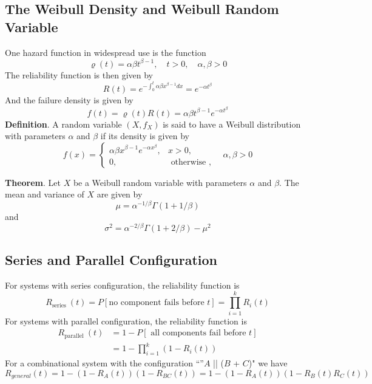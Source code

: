 \documentclass[a4paper,12pt]{article}
\begin{document}
    \subsection{The Weibull Density and Weibull Random Variable}
    One hazard function in widespread use is the function
    $$
\varrho(t)=\alpha \beta t^{\beta-1}, \quad t>0, \quad \alpha, \beta>0
$$
    The reliability function is then given by
    \begin{equation}
        R(t)=e^{-\int_0^t \alpha \beta x^{\beta-1} d x}=e^{-\alpha t^\beta}
        \end{equation}
    And the failure density is given by
    \begin{equation}
        f(t)=\varrho(t) R(t)=\alpha \beta t^{\beta-1} e^{-\alpha t^\beta}
        \end{equation}
        \noindent \textbf{Definition}. A random variable $\left(X, f_X\right)$ is said to have a Weibull distribution with parameters $\alpha$ and $\beta$ if its density is given by
        $$
        f(x)=\left\{\begin{array}{ll}
        \alpha \beta x^{\beta-1} e^{-\alpha x^\beta}, & x>0, \\
        0, & \text { otherwise },
        \end{array} \quad \alpha, \beta>0\right.
        $$

        \noindent \textbf{Theorem}. Let $X$ be a Weibull random variable with parameters $\alpha$ and $\beta$. The mean and variance of $X$ are given by
        $$
        \mu=\alpha^{-1 / \beta} \Gamma(1+1 / \beta)
        $$
        and
        $$
        \sigma^2=\alpha^{-2 / \beta} \Gamma(1+2 / \beta)-\mu^2
        $$
    
        \subsection{Series and Parallel Configuration}
        For systems with series configuration, the reliability function is
        \begin{equation}
            R_{\text {series }}(t)=P[\text {no component fails before } t]=\prod_{i=1}^k R_i(t)
            \end{equation}
        For systems with parallel configuration, the reliability function is
        \begin{equation}
            \begin{aligned}
            R_{\text {parallel }}(t) & =1-P[\text { all components fail before } t] \\
            & =1-\prod_{i=1}^k\left(1-R_i(t)\right)
            \end{aligned}
            \end{equation}
        For a combinational system with the configuration ``''$A$ || ($B$ + $C$)" we have
        $$R_{general}(t)=1-(1-R_{A}(t))(1-R_{BC}(t))=1-(1-R_A(t))(1-R_B(t)R_C(t))$$
\end{document}
